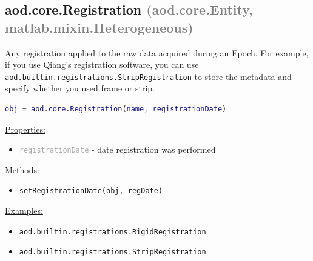 \documentclass[10pt]{exam}
\newcommand\myparent[1]{\textcolor{gray}{(#1)}}
\newcommand\aodclass[1]{\textcolor{codeblue}{\texttt{#1}}}
\newcommand\aodprop[1]{\textcolor{darkgray}{\texttt{#1}}}
\newcommand\aodfcn[1]{\textcolor{darkteal}{\texttt{#1}}}
\newcommand\docheader[1]{\vspace{0.6ex}\noindent\underline{#1}\vspace{0.15ex}}
\begin{document}
	\subsection{aod.core.Registration \myparent{aod.core.Entity, matlab.mixin.Heterogeneous}}
		\noindent Any registration applied to the raw data acquired during an Epoch. For example, if you use Qiang's registration software, you can use \aodclass{aod.builtin.registrations.StripRegistration} to store the metadata and specify whether you used frame or strip.  
		
		\begin{lstlisting}[language=matlab]
obj = aod.core.Registration(name, registrationDate)
		\end{lstlisting}
		\docheader{Properties:}
		\begin{itemize}
			\item \aodprop{registrationDate} - date registration was performed
		\end{itemize}
		\docheader{Methods:}
		\begin{itemize}
			\item \aodfcn{setRegistrationDate(obj, regDate)}
		\end{itemize}
		\docheader{Examples:}
		\begin{itemize}
			\item \aodclass{aod.builtin.registrations.RigidRegistration}
			\item \aodclass{aod.builtin.registrations.StripRegistration}
		\end{itemize}
\end{document}
